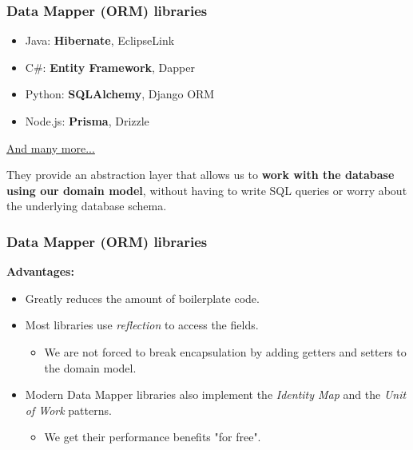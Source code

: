\documentclass{beamer}
\begin{document}
\begin{frame}
  \frametitle{Data Mapper (ORM) libraries}

  \begin{itemize}
    \item Java: \textbf{Hibernate}, EclipseLink
    \item C\#: \textbf{Entity Framework}, Dapper
    \item Python: \textbf{SQLAlchemy}, Django ORM
    \item Node.js: \textbf{Prisma}, Drizzle
  \end{itemize}
  \href{https://en.wikipedia.org/wiki/List_of_object\%E2\%80\%93relational_mapping_software}{And many more...}
  \newline

  They provide an abstraction layer that allows us to \textbf{work with the database using our domain model}, without having to write SQL queries or worry about the underlying database schema.

\end{frame}

\begin{frame}
  \frametitle{Data Mapper (ORM) libraries}

  \textbf{Advantages:}
  \begin{itemize}
    \item Greatly reduces the amount of boilerplate code.
    \item Most libraries use \textit{reflection} to access the fields.
    \begin{itemize}
      \item We are not forced to break encapsulation by adding getters and setters to the domain model.
    \end{itemize}
    \item Modern Data Mapper libraries also implement the \textit{Identity Map} and the \textit{Unit of Work} patterns.
    \begin{itemize}
      \item We get their performance benefits "for free".
    \end{itemize}
  \end{itemize}
\end{frame}
\end{document}
